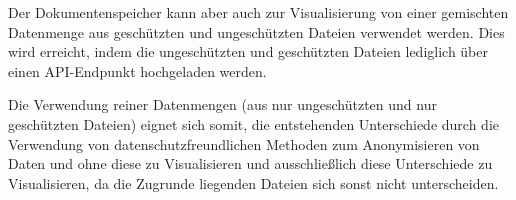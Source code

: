 \documentclass[
    fontsize=12pt,
    headings=small,
    parskip=half,           %
    bibliography=totoc,
    numbers=noenddot,       %
    open=any,               %
    ]{scrreprt}
\begin{document}
Der Dokumentenspeicher kann aber auch zur Visualisierung von einer gemischten Datenmenge aus geschützten und ungeschützten Dateien verwendet werden. Dies wird erreicht, indem die ungeschützten und geschützten Dateien lediglich über einen API-Endpunkt hochgeladen werden.

Die Verwendung reiner Datenmengen (aus nur ungeschützten und nur geschützten Dateien) eignet sich somit, die entstehenden Unterschiede durch die Verwendung von datenschutzfreundlichen Methoden zum Anonymisieren von Daten und ohne diese zu Visualisieren und ausschließlich diese Unterschiede zu Visualisieren, da die Zugrunde liegenden Dateien sich sonst nicht unterscheiden. 
  
\end{document}
